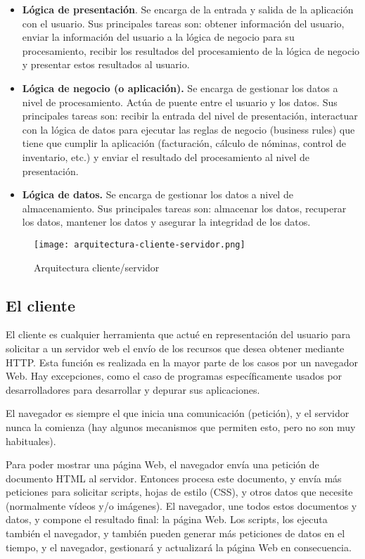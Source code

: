 \begin{itemize}
\item \textbf{Lógica de presentación}. Se encarga de la entrada y salida de la aplicación con
el usuario. Sus principales tareas son: obtener información del usuario, enviar la
información del usuario a la lógica de negocio para su procesamiento, recibir los
resultados del procesamiento de la lógica de negocio y presentar estos resultados
al usuario.

\item \textbf{Lógica de negocio (o aplicación).} Se encarga de gestionar los datos a nivel
de procesamiento. Actúa de puente entre el usuario y los datos. Sus principales
tareas son: recibir la entrada del nivel de presentación, interactuar con la lógica
de datos para ejecutar las reglas de negocio (business rules) que tiene que cumplir la aplicación (facturación, cálculo de nóminas, control de inventario, etc.) y
enviar el resultado del procesamiento al nivel de presentación.


\item \textbf{Lógica de datos.} Se encarga de gestionar los datos a nivel de almacenamiento.
Sus principales tareas son: almacenar los datos, recuperar los datos, mantener
los datos y asegurar la integridad de los datos.
\end{itemize}	

\begin{figure}[H]
	\center
	\texttt{[image: arquitectura-cliente-servidor.png]}
	\caption{Arquitectura cliente/servidor}
	\label{fig:super}
\end{figure}

\subsection{El cliente}
\cite{mdn}El cliente es cualquier herramienta que actué en representación del usuario para solicitar a
un servidor web el envío de los recursos que desea obtener mediante HTTP. Esta función es realizada en la mayor parte de los casos por un navegador Web. Hay excepciones, como el caso de programas específicamente usados por desarrolladores para desarrollar y depurar sus aplicaciones. 

El navegador es siempre el que inicia una comunicación (petición), y el servidor nunca la comienza (hay algunos mecanismos que permiten esto, pero no son muy habituales).  

Para poder mostrar una página Web, el navegador envía una petición de documento HTML al servidor. Entonces procesa este documento, y envía más peticiones para solicitar scripts, hojas de estilo (CSS), y otros datos que necesite (normalmente vídeos y/o imágenes). El navegador, une todos estos documentos y datos, y compone el resultado final: la página Web. Los scripts, los ejecuta también el navegador, y también pueden generar más peticiones de datos en el tiempo, y el navegador, gestionará y actualizará la página Web en consecuencia. 

